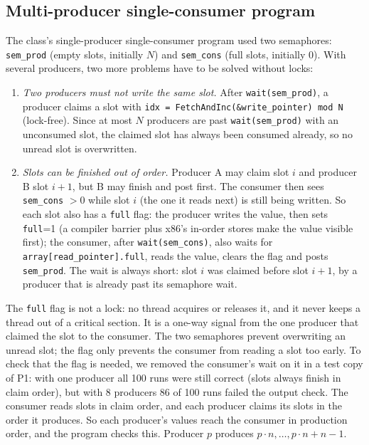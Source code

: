 \documentclass[10pt,a4paper]{article}
\begin{document}
\subsection{Multi-producer single-consumer program}
The class's single-producer single-consumer program used two semaphores: \texttt{sem\_prod} (empty slots, initially $N$) and \texttt{sem\_cons} (full slots, initially 0).
With several producers, two more problems have to be solved without locks:
\begin{enumerate}
\item \emph{Two producers must not write the same slot.} After \texttt{wait(sem\_prod)}, a producer claims a slot with \texttt{idx = FetchAndInc(\&write\_pointer) mod N}
      (lock-free). Since at most $N$ producers are past \texttt{wait(sem\_prod)} with an unconsumed slot, the claimed slot has always been consumed already,
      so no unread slot is overwritten.
\item \emph{Slots can be finished out of order.} Producer A may claim slot $i$ and producer B slot $i{+}1$, but B may finish and post first.
      The consumer then sees \texttt{sem\_cons} $>0$ while slot $i$ (the one it reads next) is still being written. So each slot also has a \texttt{full} flag:
      the producer writes the value, then sets \texttt{full}=1 (a compiler barrier plus x86's in-order stores make the value visible first);
      the consumer, after \texttt{wait(sem\_cons)}, also waits for \texttt{array[read\_pointer].full}, reads the value, clears the flag and posts \texttt{sem\_prod}.
      The wait is always short: slot $i$ was claimed before slot $i{+}1$, by a producer that is already past its semaphore wait.
\end{enumerate}
The \texttt{full} flag is not a lock: no thread acquires or releases it, and it never keeps a thread out of a critical section. It is a one-way signal from the one producer
that claimed the slot to the consumer. The two semaphores prevent overwriting an unread slot; the flag only prevents the consumer from reading a slot too early.
To check that the flag is needed, we removed the consumer's wait on it in a test copy of P1: with one producer all 100 runs were still correct
(slots always finish in claim order), but with 8 producers 86 of 100 runs failed the output check.
The consumer reads slots in claim order, and each producer claims its slots in the order it produces. So each producer's values reach the consumer in production order,
and the program checks this. Producer $p$ produces $p\cdot n, \ldots, p\cdot n + n - 1$.
\end{document}
